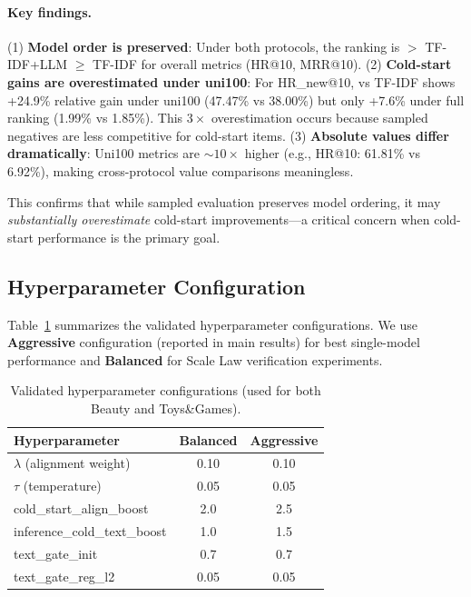 \paragraph{Key findings.}
(1) \textbf{Model order is preserved}: Under both protocols, the ranking is \model $>$ TF-IDF+LLM $\geq$ TF-IDF for overall metrics (HR@10, MRR@10).
(2) \textbf{Cold-start gains are overestimated under uni100}: For HR\_new@10, \model vs TF-IDF shows +24.9\% relative gain under uni100 (47.47\% vs 38.00\%) but only +7.6\% under full ranking (1.99\% vs 1.85\%). This $3\times$ overestimation occurs because sampled negatives are less competitive for cold-start items.
(3) \textbf{Absolute values differ dramatically}: Uni100 metrics are ${\sim}10\times$ higher (e.g., HR@10: 61.81\% vs 6.92\%), making cross-protocol value comparisons meaningless.

This confirms that while sampled evaluation preserves model ordering, it may \emph{substantially overestimate} cold-start improvements---a critical concern when cold-start performance is the primary goal.

\subsection{Hyperparameter Configuration}
\label{app:hyper}
Table~\ref{tab:hyper_config} summarizes the validated hyperparameter configurations.
We use \textbf{Aggressive} configuration (reported in main results) for best single-model performance
and \textbf{Balanced} for Scale Law verification experiments.

\begin{table}[t]
\caption{Validated hyperparameter configurations (used for both Beauty and Toys\&Games).}
\label{tab:hyper_config}
\centering
\small
\begin{tabular}{lcc}
\toprule
\textbf{Hyperparameter} & \textbf{Balanced} & \textbf{Aggressive} \\
\midrule
$\lambda$ (alignment weight) & 0.10 & 0.10 \\
$\tau$ (temperature) & 0.05 & 0.05 \\
cold\_start\_align\_boost & 2.0 & 2.5 \\
inference\_cold\_text\_boost & 1.0 & 1.5 \\
text\_gate\_init & 0.7 & 0.7 \\
text\_gate\_reg\_l2 & 0.05 & 0.05 \\
\bottomrule
\end{tabular}
\end{table}


